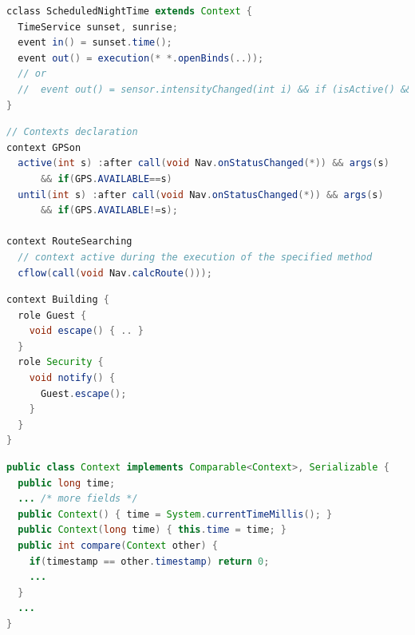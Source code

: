 \documentclass[a4paper]{article}
\begin{document}
\begin{lstlisting}[float, language=Java, caption=ECaesarJ context declaration, label={listing:ecaesarjcontext}]
cclass ScheduledNightTime extends Context {
  TimeService sunset, sunrise;
  event in() = sunset.time();
  event out() = execution(* *.openBinds(..));
  // or
  //  event out() = sensor.intensityChanged(int i) && if (isActive() && i > threshold);
}
\end{lstlisting}

\begin{lstlisting}[float, language=Java, caption=Javanese context declaration, label={listing:javanesecontext}]
// Contexts declaration
context GPSon
  active(int s) :after call(void Nav.onStatusChanged(*)) && args(s)
      && if(GPS.AVAILABLE==s)
  until(int s) :after call(void Nav.onStatusChanged(*)) && args(s)
      && if(GPS.AVAILABLE!=s);
      
context RouteSearching
  // context active during the execution of the specified method
  cflow(call(void Nav.calcRoute()));
\end{lstlisting}

\begin{lstlisting}[float, language=Java, caption=NextEJ context declaration, label={listing:nextejcontext}]
context Building {
  role Guest {
    void escape() { .. }
  }
  role Security {
    void notify() {
      Guest.escape();
    }
  }
}
\end{lstlisting}

\begin{lstlisting}[float, language=Java, caption=EventJava context declaration, label={listing:eventjavacontext}]
public class Context implements Comparable<Context>, Serializable {
  public long time;
  ... /* more fields */
  public Context() { time = System.currentTimeMillis(); }
  public Context(long time) { this.time = time; }
  public int compare(Context other) {
    if(timestamp == other.timestamp) return 0;
    ...
  }
  ...
}
\end{lstlisting}
\end{document}
